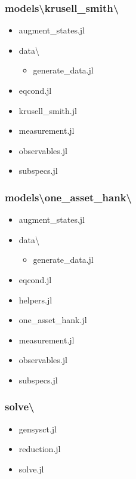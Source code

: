 \documentclass{beamer}
\begin{document}
\begin{frame}
\frametitle{models\textbackslash krusell\_smith\textbackslash}
    \begin{itemize}
      \item augment\_states.jl
      \item data\textbackslash
      \begin{itemize}
        \item generate\_data.jl
       \end{itemize}
      \item eqcond.jl
      \item krusell\_smith.jl
      \item measurement.jl
      \item observables.jl
      \item subspecs.jl
    \end{itemize}
\end{frame}

\begin{frame}
\frametitle{models\textbackslash one\_asset\_hank\textbackslash}
    \begin{itemize}
      \item augment\_states.jl
      \item data\textbackslash
      \begin{itemize}
        \item generate\_data.jl
       \end{itemize}
      \item eqcond.jl
      \item helpers.jl
      \item one\_asset\_hank.jl
      \item measurement.jl
      \item observables.jl
      \item subspecs.jl
    \end{itemize}
\end{frame}

\begin{frame}
  \frametitle{solve\textbackslash}
   \begin{itemize}
    \item gensysct.jl
    \item reduction.jl
    \item solve.jl
  \end{itemize}
\end{frame}
\end{document}
